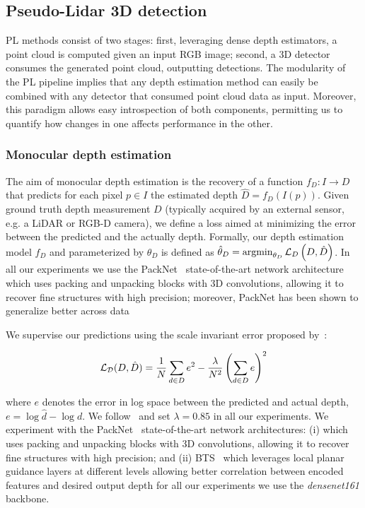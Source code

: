 \subsection{Pseudo-Lidar 3D detection}
\label{subsec:pseudo-lidar}
PL methods consist of two stages: first, leveraging dense depth estimators, a point cloud is computed given an input RGB image; second, a 3D detector consumes the generated point cloud, outputting detections. The modularity of the PL pipeline implies that any depth estimation method can easily be combined with any detector that consumed point cloud data as input. Moreover, this paradigm allows easy introspection of both components, permitting us to quantify how changes in one affects performance in the other. 

\subsubsection{Monocular depth estimation}
\label{subsubsec:monodepth}

The aim of monocular depth estimation is the recovery of a function $f_D: I \to D$ that predicts for each pixel $p \in I$ the estimated depth $\hat{D} = f_D\left( I\left(p\right)\right)$. Given ground truth depth measurement $D$ (typically acquired by an external sensor, e.g. a LiDAR or RGB-D camera), we define a loss aimed at minimizing the error between the predicted and the actually depth. Formally, our depth estimation model $f_D$ and parameterized by $\theta_D$ is defined as $\hat{\theta}_D = \operatorname*{argmin}_{\theta_D}\mathcal{L}_{D}\left(D,\hat{D}\right)$. In all our experiments we use the  PackNet~\cite{guizilini20203d} state-of-the-art network architecture which uses packing and unpacking blocks with 3D convolutions, allowing it to recover fine structures with high precision; moreover, PackNet has been shown to generalize better across data

% 


We supervise our predictions using the scale invariant error proposed by~\cite{eigen2014depth}:  

\begin{equation} \label{eq:silog_loss}
\small
\mathcal{L_D}(D, \hat{D}) =
\frac{1}{N} \sum_{d \in D} e ^2 - \frac{\lambda}{N^2} \left(\sum_{d \in D} e \right)^2
\end{equation}

\noindent where $e$ denotes the error in log space between the predicted and actual depth, $e = \log \hat{d} - \log d$. We follow~\cite{lee2019big} and set $\lambda=0.85$ in all our experiments. We experiment with the PackNet~\cite{guizilini20203d} state-of-the-art network architectures: (i) which uses packing and unpacking blocks with 3D convolutions, allowing it to recover fine structures with high precision; and (ii) BTS~\cite{lee2019big} which leverages local planar guidance layers at different levels allowing better correlation between encoded features and desired output depth  for all our experiments we use the \textit{densenet161} backbone.

